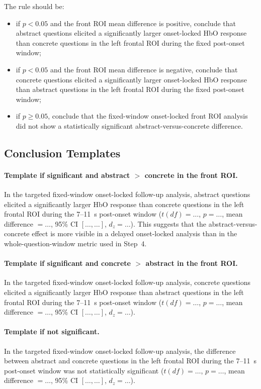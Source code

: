 The rule should be:
\begin{itemize}
    \item if \(p < 0.05\) and the front ROI mean difference is positive, conclude that abstract
    questions elicited a significantly larger onset-locked HbO response than concrete questions
    in the left frontal ROI during the fixed post-onset window;
    \item if \(p < 0.05\) and the front ROI mean difference is negative, conclude that concrete
    questions elicited a significantly larger onset-locked HbO response than abstract questions
    in the left frontal ROI during the fixed post-onset window;
    \item if \(p \geq 0.05\), conclude that the fixed-window onset-locked front ROI analysis
    did not show a statistically significant abstract-versus-concrete difference.
\end{itemize}

\subsection{Conclusion Templates}

\paragraph{Template if significant and abstract \(>\) concrete in the front ROI.}
In the targeted fixed-window onset-locked follow-up analysis, abstract questions elicited a
significantly larger HbO response than concrete questions in the left frontal ROI during the
7--11~s post-onset window
(\(t(df)=\ldots\), \(p=\ldots\), mean difference \(=\ldots\), 95\% CI \([\ldots,\ldots]\), \(d_z=\ldots\)).
This suggests that the abstract-versus-concrete effect is more visible in a delayed onset-locked
analysis than in the whole-question-window metric used in Step~4.

\paragraph{Template if significant and concrete \(>\) abstract in the front ROI.}
In the targeted fixed-window onset-locked follow-up analysis, concrete questions elicited a
significantly larger HbO response than abstract questions in the left frontal ROI during the
7--11~s post-onset window
(\(t(df)=\ldots\), \(p=\ldots\), mean difference \(=\ldots\), 95\% CI \([\ldots,\ldots]\), \(d_z=\ldots\)).

\paragraph{Template if not significant.}
In the targeted fixed-window onset-locked follow-up analysis, the difference between abstract and
concrete questions in the left frontal ROI during the 7--11~s post-onset window was not
statistically significant
(\(t(df)=\ldots\), \(p=\ldots\), mean difference \(=\ldots\), 95\% CI \([\ldots,\ldots]\), \(d_z=\ldots\)).

